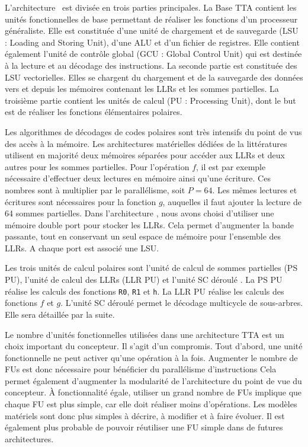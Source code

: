 L'architecture \TTSC~est divisée en trois parties principales. La Base TTA contient les unités fonctionnelles de base permettant de réaliser les fonctions d'un processeur généraliste. Elle est constituée d'une unité de chargement et de sauvegarde (LSU : Loading and Storing Unit), d'une ALU et d'un fichier de registres. Elle contient également l'unité de contrôle global (GCU : Global Control Unit) qui est destinée à la lecture et au décodage des instructions. La seconde partie est constituée des LSU vectorielles. Elles se chargent du chargement et de la sauvegarde des données vers et depuis les mémoires contenant les LLRs et les sommes partielles.
La troisième partie contient les unités de calcul (PU : Processing Unit), dont le but est de réaliser les fonctions élémentaires polaires.

Les algorithmes de décodages de codes polaires sont très intensifs du point de vus des accès à la mémoire. Les architectures matérielles dédiées de la littératures utilisent en majorité deux mémoires séparées pour accéder aux LLRs et deux autres pour les sommes partielles. Pour l'opération $f$, il est par exemple nécessaire d'effectuer deux lectures en mémoire ainsi qu'une écriture. Ces nombres sont à multiplier par le parallélisme, soit $P=64$. Les mêmes lectures et écritures sont nécessaires pour la fonction $g$, auquelles il faut ajouter la lecture de 64 sommes partielles. Dans l'architecture \TTSC, nous avons choisi d'utiliser une mémoire double port pour stocker les LLRs. Cela permet d'augmenter la bande passante, tout en conservant un seul espace de mémoire pour l'ensemble des LLRs. A chaque port est associé une LSU.

Les trois unités de calcul polaires sont l'unité de calcul de sommes partielles (PS PU), l'unité de calcul des LLRs (LLR PU) et l'unité \og SC déroulé \fg. La PS PU réalise les calculs des fonctions \texttt{R0}, \texttt{R1} et \texttt{h}. La LLR PU réalise les calculs des fonctions $f$ et $g$. L'unité \og SC déroulé \fg permet le décodage multicycle de sous-arbres. Elle sera détaillée par la suite. 

Le nombre d'unités fonctionnelles utilisées dans une architecture TTA est un choix important du concepteur.
Il s'agit d'un compromis.
Tout d'abord, une unité fonctionnelle ne peut activer qu'une opération à la fois.
Augmenter le nombre de FUs est donc nécessaire pour bénéficier du parallélisme d'instructions
Cela permet également d'augmenter la modularité de l'architecture du point de vue du concepteur.
\`A fonctionnalité égale, utiliser un grand nombre de FUs implique que chaque FU est plus simple, car elle doit réaliser moins d'opérations. Les modèles matériels sont donc plus simples à décrire, à modifier et à faire évoluer. Il est également plus probable de pouvoir réutiliser une FU simple dans de futures architectures.

